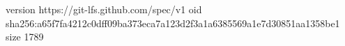 version https://git-lfs.github.com/spec/v1
oid sha256:a65f7fa4212c0dff09ba373eca7a123d2f3a1a6385569a1e7d30851aa1358be1
size 1789
